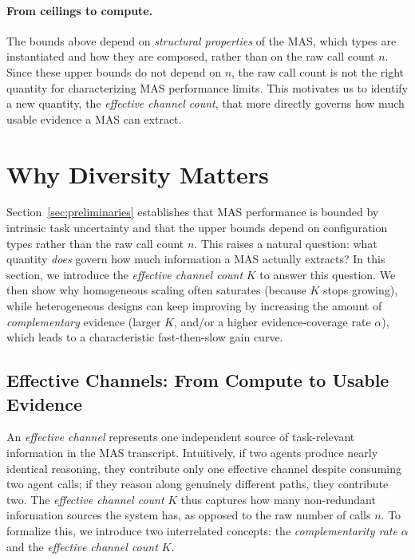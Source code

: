 \documentclass{article}
\theoremstyle{plain}
\theoremstyle{definition}
\theoremstyle{remark}
\begin{document}
\vspace{-0.2cm}
\paragraph{From ceilings to compute.}
The bounds above depend on \emph{structural properties} of the MAS, which types are instantiated and how they are composed, rather than on the raw call count $n$.
Since these upper bounds do not depend on $n$, the raw call count is not the right quantity for characterizing MAS performance limits. This motivates us to identify a new quantity, the \emph{effective channel count}, that more directly governs how much usable evidence a MAS can extract.


\section{Why Diversity Matters}
\label{sec:K_theory_practice}

Section~\ref{sec:preliminaries} establishes that MAS performance is bounded by intrinsic task uncertainty and that the upper bounds depend on configuration types rather than the raw call count $n$.
This raises a natural question: what quantity \emph{does} govern how much information a MAS actually extracts? In this section, we introduce the \emph{effective channel count} $K$ to answer this question. We then show why homogeneous scaling often saturates (because $K$ stops growing), while heterogeneous designs can keep improving by increasing the amount of \emph{complementary} evidence (larger $K$, and/or a higher evidence-coverage rate $\alpha$), which leads to a characteristic fast-then-slow gain curve.


\subsection{Effective Channels: From Compute to Usable Evidence}
\label{sec:effective-channels}

An \emph{effective channel} represents one independent source of task-relevant information in the MAS transcript. Intuitively, if two agents produce nearly identical reasoning, they contribute only one effective channel despite consuming two agent calls; if they reason along genuinely different paths, they contribute two. The \emph{effective channel count} $K$ thus captures how many non-redundant information sources the system has, as opposed to the raw number of calls $n$.
To formalize this, we introduce two interrelated concepts: the \emph{complementarity rate} $\alpha$ and the \emph{effective channel count} $K$.
\end{document}

